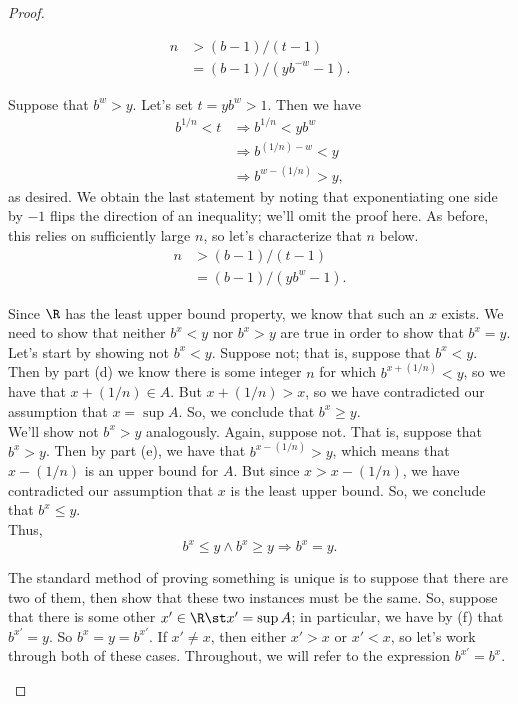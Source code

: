 \documentclass{assignment}
\begin{document}
\begin{proof}
\begin{qparts}
\begin{align*}
      n &> (b - 1)/(t - 1) \\
        &= (b - 1)/(yb^{-w} - 1).
     \end{align*}
  \item Suppose that $b^w > y$. Let's set $t = yb^w > 1$. Then we have 
    \begin{align*}
      b^{1/n} < t &\Rightarrow b^{1/n} < yb^w \\
                  &\Rightarrow b^{(1/n) - w} < y \\
                  &\Rightarrow b^{w - (1/n)} > y,
    \end{align*}
    as desired. We obtain the last statement by noting that exponentiating one side by $-1$ flips the 
    direction of an inequality; we'll omit the proof here. As before, this relies on sufficiently large
    $n$, so let's characterize that $n$ below.
    \begin{align*}
      n &> (b - 1)/(t - 1) \\
        &= (b - 1)/(yb^w - 1).
    \end{align*}
  \item Since $\R$ has the least upper bound property, we know that such an $x$ exists. We need to 
    show that neither $b^x < y$ nor $b^x > y$ are true in order to show that $b^x = y$. \\

    Let's start by showing not $b^x < y$. Suppose not; that is, suppose that $b^x <  y$. Then by part 
    (d) we know there is some integer $n$ for which $b^{x  + (1/n)} < y$, so we have that $x + (1/n)
    \in A$. But $x + (1/n) > x$, so we have contradicted our assumption that $x = \sup A$. So, we 
    conclude that $b^x \geq y$. \\

    We'll show not $b^x > y$ analogously. Again, suppose not. That is, suppose that $b^x > y$. Then 
    by part (e), we have that  $b^{x - (1/n)} > y$, which means that $x - (1/n)$ is an upper bound for
    $A$. But since $x > x - (1/n)$, we have contradicted our assumption that $x$ is the least upper
    bound. So, we conclude that $b^x \leq y$. \\

    Thus, $$b^x \leq y \wedge b^x \geq y \Rightarrow b^x = y.$$
  \item The standard method of proving something is unique is to suppose that there are two of them,
    then show that these two instances must be the same. So, suppose that there is some other $x'\in
    \R \st x' = \sup A$; in particular, we have by (f) that $b^{x'} = y$. So $b^x = y = b^{x'}$. 
    If $x' \neq x$, then either $x' > x$ or $x' < x$, so let's work through both of these cases. 
    Throughout, we will refer to the expression $b^{x'} = b^x$. \\


\end{qparts}
\end{proof}
\end{document}

